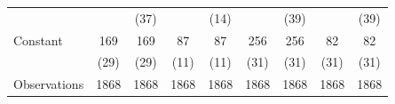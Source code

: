 \begin{table}[htbp]
\begin{tabular}{l*{8}{c}}
                    &                     &        (37)         &                     &        (14)         &                     &        (39)         &                     &        (39)         \\\addlinespace
Constant            &         169\sym{***}&         169\sym{***}&          87\sym{***}&          87\sym{***}&         256\sym{***}&         256\sym{***}&          82\sym{***}&          82\sym{***}\\
                    &        (29)         &        (29)         &        (11)         &        (11)         &        (31)         &        (31)         &        (31)         &        (31)         \\
\midrule
Observations        &        1868         &        1868         &        1868         &        1868         &        1868         &        1868         &        1868         &        1868         \\
\bottomrule
\end{tabular}
\end{table}
